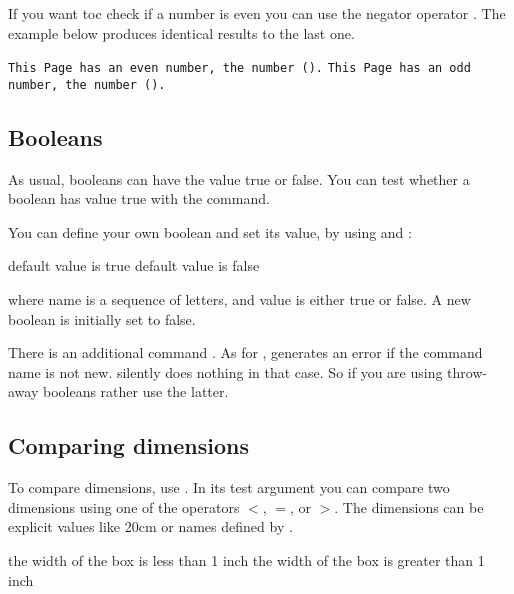 If you want toc check if a number is even you can use the negator
operator . The example below produces identical results to the last one.

\begin{teX}
\ifthenelse{\NOT\isodd{\thepage}}
{\tt This Page has an even number, the number (\thepage).}
{\tt This Page has an odd number, the number (\thepage).}
\end{teX}

\subsection{Booleans}

As usual, booleans can have the value true or false. You can
test whether a boolean has value true with the  command.

\begin{teX}
\end{teX}

You can define your own boolean and set its value, by using
 and :

\begin{teX}

\ifthenelse{\isOdd}
  {default value is true}
  {default value is false}
\end{teX}

where name is a sequence of letters, and value is either true or
false. A new boolean is initially set to false.

There is an additional command .  As for ,  generates
an error if the command name is not new.  silently does nothing
in that case. So if you are using throw-away booleans rather use the latter.

\subsection{Comparing dimensions}

To compare dimensions, use . In its test argument you
can compare two dimensions using one of the operators $<$, $=$, or
$>$. The dimensions can be explicit values like 20cm or names
defined by .

\begin{teX}
\newlength\boxwidth
\setlength{\boxwidth}{10cm}
\ifthenelse{\lengthtest{\boxwidth<2.54cm}}
  {the width of the box is less than 1 inch}  
  {the width of the box is greater than 1 inch}  
\end{teX}

